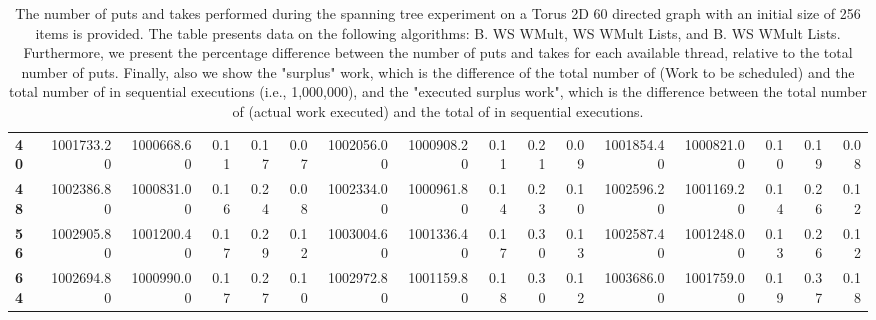 \begin{table}[!ht]
{\begin{tabular}{lrrrrrrrrrrrrrrr}
\textbf{40} &  1001733.20 & 1000668.60 &           0.11 &        0.17 &                 0.07 &     1002056.00 & 1000908.20 &           0.11 &        0.21 &                 0.09 &        1001854.40 & 1000821.00 &           0.10 &        0.19 &                 0.08 \\
\textbf{48} &  1002386.80 & 1000831.00 &           0.16 &        0.24 &                 0.08 &     1002334.00 & 1000961.80 &           0.14 &        0.23 &                 0.10 &        1002596.20 & 1001169.20 &           0.14 &        0.26 &                 0.12 \\
\textbf{56} &  1002905.80 & 1001200.40 &           0.17 &        0.29 &                 0.12 &     1003004.60 & 1001336.40 &           0.17 &        0.30 &                 0.13 &        1002587.40 & 1001248.00 &           0.13 &        0.26 &                 0.12 \\
\textbf{64} &  1002694.80 & 1000990.00 &           0.17 &        0.27 &                 0.10 &     1002972.80 & 1001159.80 &           0.18 &        0.30 &                 0.12 &        1003686.00 & 1001759.00 &           0.19 &        0.37 &                 0.18 \\
\bottomrule
\end{tabular}}
\label{difference-Torus_2D_60_directed-256-B_WS_NC_MULT_OPT-WS_NC_MULT_LA_OPT-B_WS_NC_MULT_LA_OPT}
\caption{The number of puts and takes performed during the
    spanning tree experiment on a Torus 2D 60 directed graph with an initial size
    of 256 items is provided. The table presents data on the
    following algorithms: B. WS WMult, WS WMult Lists, and
    B. WS WMult Lists. Furthermore, we present the percentage difference
    between the number of puts and takes for each available thread,
    relative to the total number of puts. Finally, also we show the
    "surplus" work, which is the difference of the total number of
    \Puts (Work to be scheduled) and the total number of \Puts in
    sequential executions (i.e., 1,000,000), and the "executed surplus
    work", which is the difference between the total number of \Takes
    (actual work executed) and the total of \Takes in sequential
    executions.}
\end{table}
